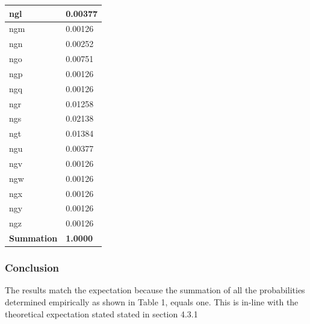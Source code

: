 \documentclass[12pt]{article}
\begin{document}
\begin{center}
\begin{longtable}{ | p{5em} | p{6.5em} | }
	\hline
	\centering ngl    & 0.00377\\
	\hline
	
	\hline
	\centering ngm  &   0.00126\\
	\hline
	
	
	\hline
	\centering ngn   &  0.00252\\
	\hline
	
	
	\hline
	\centering ngo   &  0.00751\\
	\hline
	
	
	\hline
	\centering ngp   &  0.00126\\
	\hline
	
	\hline
	\centering ngq   &  0.00126\\
	\hline
	
	\hline
	\centering ngr    & 0.01258\\
	\hline
	
	\hline
	\centering ngs   &  0.02138\\
	\hline
	
	\hline
	\centering ngt    & 0.01384\\
	\hline
	
	\hline
	\centering ngu    & 0.00377\\
	\hline
	
	
	\hline
	\centering ngv     & 0.00126\\
	\hline
	
	\hline
	\centering ngw    & 0.00126\\
	\hline
	
	
	\hline
	\centering ngx    & 0.00126\\
	\hline
	
	\hline
	\centering ngy    & 0.00126\\
	\hline
	
	\hline
	\centering ngz    & 0.00126\\
	\hline
	
	\hline
	\centering \textbf{Summation}   &  \textbf{1.0000}\\
	\hline
\end{longtable}
\end{center}

\subsubsection{Conclusion}
The results match the expectation because the summation of all the probabilities determined empirically as shown in Table 1, equals one. This is in-line with the theoretical expectation stated stated in section 4.3.1 
\end{document}
